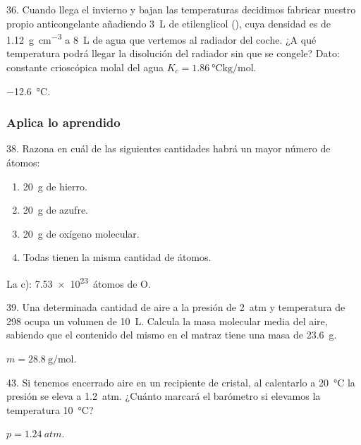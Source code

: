 \documentclass[11pt]{article}
\begin{document}
\begin{multicols}{2}
\begin{exercise}
  36. Cuando llega el invierno y bajan las temperaturas decidimos
  fabricar nuestro propio anticongelante añadiendo \SI{3}{\liter} de
  etilenglicol (), cuya densidad es de \SI{1.12}{\gram\per\cubic\centi\meter} a \SI{8}{\liter}
  de agua que vertemos al radiador del coche. ¿A qué temperatura
  podrá llegar la disolución del radiador sin que se congele?
  Dato: constante crioscópica molal del agua $K_c = \SI{1.86}{\celsius\kilo\gram\per\mole}$. %
\end{exercise}
\begin{solution}
  \SI{-12.6}{\celsius}.
\end{solution}



\subsubsection{Aplica lo aprendido}

\begin{exercise}
  38. Razona en cuál de las siguientes cantidades habrá un mayor número de átomos:
  \begin{enumerate}
    \item \SI{20}{\gram} de hierro.
    \item \SI{20}{\gram} de azufre.
    \item \SI{20}{\gram} de oxígeno molecular.
    \item Todas tienen la misma cantidad de átomos.
  \end{enumerate}
\end{exercise}
\begin{solution}
  La c): \SI{7.53e23}{átomos} de O.
\end{solution}

\begin{exercise}
  39. Una determinada cantidad de aire a la presión de \SI{2}{atm} y
  temperatura de \SI{298}{\Kelvin} ocupa un volumen de \SI{10}{\liter}. Calcula la masa molecular media del aire, sabiendo que el contenido del
  mismo en el matraz tiene una masa de \SI{23.6}{\gram}.
\end{exercise}
\begin{solution}
  $m = \SI{28.8}{\gram\per\mole}$.
\end{solution}

\begin{exercise}
  43. Si tenemos encerrado aire en un recipiente de cristal, al
  calentarlo a \SI{20}{\celsius} la presión se eleva a \SI{1.2}{atm}. ¿Cuánto marcará el barómetro si elevamos la temperatura \SI{10}{\celsius}?
\end{exercise}
\begin{solution}
  $p = \SI{1.24}{atm}$.
\end{solution}


\end{multicols}
\end{document}
